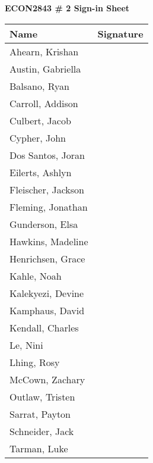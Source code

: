 \documentclass{article}
\begin{document}
	
	\begin{center}
		\Large\textbf{ECON2843 \# 2 Sign-in Sheet}
	\end{center}
	
	\vspace{1cm}
	\centering
	
	\begin{tabular}{|p{6cm}|p{6cm}|}
		\toprule
		\textbf{Name} & \textbf{Signature}  \\
		\hline
		Ahearn, Krishan&  \\
		\hline
		Austin, Gabriella&  \\
		\hline
		Balsano, Ryan& \\
		\hline
		Carroll, Addison&  \\
		\hline
		Culbert, Jacob&  \\
		\hline
		Cypher, John& \\
		\hline
		Dos Santos, Joran&  \\
		\hline
		Eilerts, Ashlyn&  \\
		\hline
		Fleischer, Jackson&  \\
		\hline
		Fleming, Jonathan&  \\
			\hline
		Gunderson, Elsa&  \\
		\hline
		Hawkins, Madeline &  \\
		\hline
		Henrichsen, Grace& \\
		\hline
		Kahle, Noah&  \\
		\hline
		Kalekyezi, Devine&  \\
		\hline
		Kamphaus, David& \\
		\hline
		Kendall, Charles&  \\
		\hline
		Le, Nini&  \\
		\hline
		Lhing, Rosy&  \\
		\hline
		McCown, Zachary&  \\
		\hline
		Outlaw, Tristen& \\
		\hline
		Sarrat, Payton&  \\
		\hline
		Schneider, Jack&  \\
		\hline
		Tarman, Luke&  \\
		\hline
		\bottomrule
	\end{tabular}
	
\end{document}
